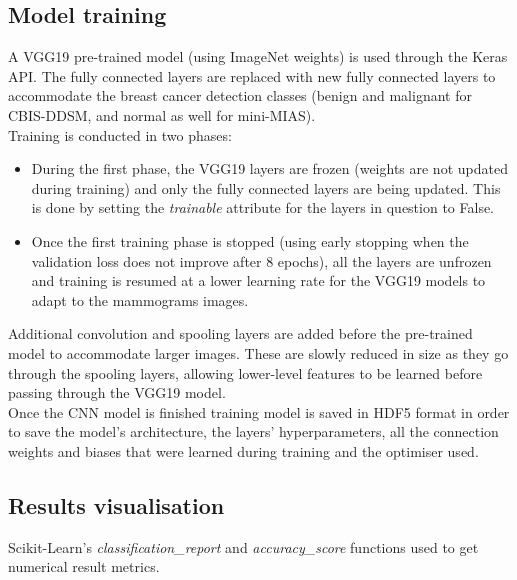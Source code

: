 
\subsection{Model training}

A VGG19 pre-trained model (using ImageNet weights) is used through the Keras API. The fully connected layers are replaced with new fully connected layers to accommodate the breast cancer detection classes (benign and malignant for CBIS-DDSM, and normal as well for mini-MIAS).\\

Training is conducted in two phases:
\begin{itemize}
    \item During the first phase, the VGG19 layers are frozen (weights are not updated during training) and only the fully connected layers are being updated. This is done by setting the \textit{trainable} attribute for the layers in question to False.
    \item Once the first training phase is stopped (using early stopping when the validation loss does not improve after 8 epochs), all the layers are unfrozen and training is resumed at a lower learning rate for the VGG19 models to adapt to the mammograms images.
\end{itemize}

Additional convolution and spooling layers are added before the pre-trained model to accommodate larger images. These are slowly reduced in size as they go through the spooling layers, allowing lower-level features to be learned before passing through the VGG19 model.\\

Once the CNN model is finished training model is saved in HDF5 format in order to save the model's architecture, the layers' hyperparameters, all the connection weights and biases that were learned during training \citep{Geron2019} and the optimiser used.


\subsection{Results visualisation}

Scikit-Learn's \textit{classification\_report} and \textit{accuracy\_score} functions used to get numerical result metrics.\\

